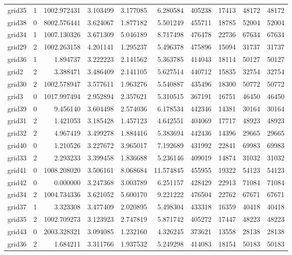 \begin{longtable}{|l|r|r|r|r|r|r|r|r|r|}
grid35 & 1 & 1002.972431 & 3.103499 & 3.177085 & 6.280584 & 405238 & 17413 & 48172 & 48172 \\
grid38 & 0 & 8002.576441 & 3.624067 & 1.877182 & 5.501249 & 455711 & 18785 & 52004 & 52004 \\
grid34 & 1 & 1007.130326 & 3.671309 & 5.046189 & 8.717498 & 476478 & 22736 & 67634 & 67634 \\
grid29 & 2 & 1002.263158 & 4.201141 & 1.295237 & 5.496378 & 475896 & 15094 & 31737 & 31737 \\
grid36 & 1 & 1.894737 & 3.222223 & 2.141562 & 5.363785 & 414043 & 18114 & 50127 & 50127 \\
grid2 & 2 & 3.388471 & 3.486409 & 2.141105 & 5.627514 & 440712 & 15835 & 32754 & 32754 \\
grid30 & 2 & 1002.578947 & 3.577611 & 1.963276 & 5.540887 & 435496 & 18300 & 50772 & 50772 \\
grid3 & 0 & 1017.997494 & 2.952894 & 2.357621 & 5.310515 & 367191 & 16751 & 46450 & 46450 \\
grid39 & 0 & 9.456140 & 3.604498 & 2.574036 & 6.178534 & 442346 & 14381 & 30164 & 30164 \\
grid31 & 2 & 1.421053 & 3.185428 & 1.457123 & 4.642551 & 404069 & 17717 & 48923 & 48923 \\
grid32 & 2 & 4.967419 & 3.499278 & 1.884416 & 5.383694 & 442436 & 14396 & 29665 & 29665 \\
grid40 & 0 & 1.210526 & 3.227672 & 3.965017 & 7.192689 & 431992 & 22841 & 69983 & 69983 \\
grid33 & 2 & 2.293233 & 3.399458 & 1.836688 & 5.236146 & 409019 & 14874 & 31032 & 31032 \\
grid41 & 0 & 1008.208020 & 3.506161 & 8.068684 & 11.574845 & 455955 & 19322 & 54123 & 54123 \\
grid42 & 0 & 0.000000 & 3.247368 & 3.003789 & 6.251157 & 428429 & 22913 & 71084 & 71084 \\
grid34 & 2 & 1004.734336 & 3.621052 & 5.600170 & 9.221222 & 476504 & 22762 & 67671 & 67671 \\
grid37 & 1 & 3.323308 & 3.477409 & 2.020895 & 5.498304 & 433318 & 16359 & 40418 & 40418 \\
grid35 & 2 & 1002.709273 & 3.123923 & 2.747819 & 5.871742 & 405272 & 17447 & 48223 & 48223 \\
grid43 & 0 & 2003.328321 & 3.094085 & 1.232160 & 4.326245 & 373621 & 13558 & 28138 & 28138 \\
grid36 & 2 & 1.684211 & 3.311766 & 1.937532 & 5.249298 & 414083 & 18154 & 50183 & 50183 \\

\end{longtable}
